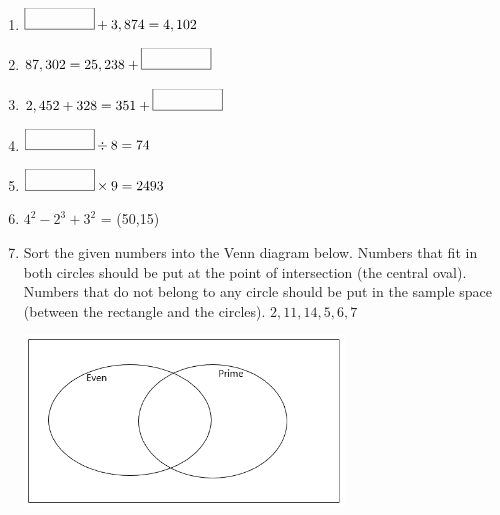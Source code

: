\documentclass{article}
\begin{document}
\begin{enumerate}
\\

\item \quad \( \framebox(50,15){} + 3,874 = 4,102 \) \vspace{5pt} \\

\item \quad \( 87,302 = 25,238 + \framebox(50,15){} \) \vspace{5pt} \\

\item \quad \( 2,452 + 328 = 351 + \framebox(50,15){} \) \vspace{5pt} \\

\item \quad \( \framebox(50,15){} \div 8 = 74  \) \vspace{5pt} \\

\item \quad \( \framebox(50,15){} \times 9 = 2493  \) \vspace{5pt} \\

\item \quad \( 4^{2} - 2^{3} + 3^{2}  \) = \framebox(50,15){} \vspace{5pt} \\

\item \quad Sort the given numbers into the Venn diagram below. Numbers that fit in both circles should be put at the point of intersection (the central oval). Numbers that do not belong to any circle should be put in the sample space (between the rectangle and the circles).\hspace{1cm} \( { 2, 11, 14, 5, 6, 7} \)

\begin{center}
\includegraphics[width=8.5cm]{Year_6_Mixed_Tests/Homework_Tasks/Venn_Even_Prime_21_11_23_.png}
\end{center}



\end{enumerate}
\end{document}
